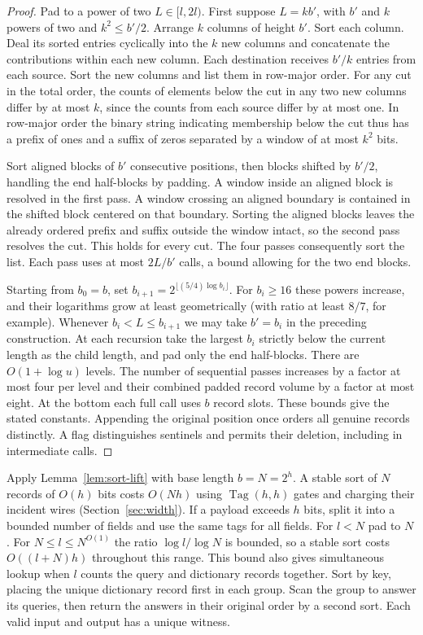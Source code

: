 \begin{proof}
Pad to a power of two $L\in[l,2l)$. First suppose $L=kb'$,
with $b'$ and $k$ powers of two and $k^2\le b'/2$. Arrange $k$
columns of height $b'$. Sort each column. Deal its sorted entries
cyclically into the $k$ new columns and concatenate the contributions
within each new column. Each destination receives $b'/k$ entries from
each source. Sort the new columns and list them in row-major order.
For any cut in the total order, the counts of elements below the cut
in any two new columns differ by at most $k$, since the counts from
each source differ by at most one. In row-major order the binary
string indicating membership below the cut thus has a prefix of ones
and a suffix of zeros separated by a window of at most $k^2$ bits.

Sort aligned blocks of $b'$ consecutive positions, then blocks shifted
by $b'/2$, handling the end half-blocks by padding. A window inside
an aligned block is resolved in the first pass. A window crossing an
aligned boundary is contained in the shifted block centered on that
boundary. Sorting the aligned blocks leaves the already ordered prefix
and suffix outside the window intact, so the second pass resolves the
cut. This holds for every cut. The four passes consequently sort the
list. Each pass uses at most $2L/b'$ calls, a bound allowing for the
two end blocks.

Starting from $b_0=b$, set $b_{i+1}=2^{\lfloor(5/4)\log b_i\rfloor}$.
For $b_i\ge16$ these powers increase, and their logarithms grow at
least geometrically (with ratio at least $8/7$, for example).
Whenever $b_i<L\le b_{i+1}$ we may take $b'=b_i$ in the preceding
construction. At each recursion take the largest $b_i$ strictly below the current
length as the child length, and pad only the end half-blocks.
There are $O(1+\log u)$ levels. The number of sequential passes
increases by a factor at most four per level and their combined padded
record volume by a factor at most eight. At the bottom each full call
uses $b$ record slots. These bounds give the stated constants. Appending
the original position once orders all genuine records distinctly. A
flag distinguishes sentinels and permits their deletion, including
in intermediate calls.
\end{proof}

Apply Lemma~\ref{lem:sort-lift} with base length $b=N=2^h$.
A stable sort of $N$ records of $O(h)$ bits costs $O(Nh)$ using
$\operatorname{Tag}(h,h)$ gates and charging their incident wires
(Section~\ref{sec:width}). If a payload exceeds $h$ bits, split it into a bounded number of
fields and use the same tags for all fields. For $l<N$ pad to
$N$. For $N\le l\le N^{O(1)}$ the ratio $\log l/\log N$ is bounded,
so a stable sort costs $O((l+N)h)$ throughout this range. This bound
also gives simultaneous lookup when $l$ counts the query and
dictionary records together. Sort by key, placing the unique
dictionary record first in each group. Scan the group to answer its
queries, then return the answers in their original order by a second
sort. Each valid input and output has a unique witness.


